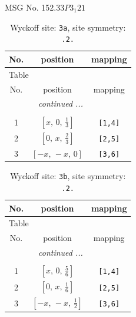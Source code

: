\documentclass[fleqn,8pt]{jsarticle}
\begin{document}
\setcounter{MaxMatrixCols}{32}

\renewcommand{\tablename}{Table~}
\renewcommand{\figurename}{Figure~}
\begin{center}
\LARGE
MSG No. 152.33\quad$P3_{1}21$
\end{center}
\renewcommand{\arraystretch}{1.2}
\begin{longtable}{ccc}
\caption{Wyckoff site: {\tt 3a}, site symmetry: {\tt .2.}}
 \\
 \hline \hline
No. & position & mapping \\ \hline \endfirsthead

\multicolumn{2}{l}{\tablename\ \thetable{}} \\
 \hline \hline
No. & position & mapping \\ \hline \endhead

 \hline \hline
\multicolumn{2}{r}{\footnotesize\it continued ...} \\ \endfoot

 \hline \hline
\multicolumn{2}{r}{} \\ \endlastfoot

1 & $\left[ x,\, 0,\, \frac{1}{3} \right]$ & {\tt [1,4]} \\ \hline
2 & $\left[ 0,\, x,\, \frac{2}{3} \right]$ & {\tt [2,5]} \\ \hline
3 & $\left[ - x,\, - x,\, 0 \right]$ & {\tt [3,6]} \\
\end{longtable}
\renewcommand{\arraystretch}{1.2}
\begin{longtable}{ccc}
\caption{Wyckoff site: {\tt 3b}, site symmetry: {\tt .2.}}
 \\
 \hline \hline
No. & position & mapping \\ \hline \endfirsthead

\multicolumn{2}{l}{\tablename\ \thetable{}} \\
 \hline \hline
No. & position & mapping \\ \hline \endhead

 \hline \hline
\multicolumn{2}{r}{\footnotesize\it continued ...} \\ \endfoot

 \hline \hline
\multicolumn{2}{r}{} \\ \endlastfoot

1 & $\left[ x,\, 0,\, \frac{5}{6} \right]$ & {\tt [1,4]} \\ \hline
2 & $\left[ 0,\, x,\, \frac{1}{6} \right]$ & {\tt [2,5]} \\ \hline
3 & $\left[ - x,\, - x,\, \frac{1}{2} \right]$ & {\tt [3,6]} \\
\end{longtable}
\end{document}
